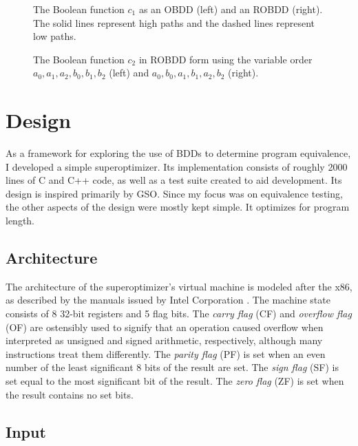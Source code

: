 \documentclass[a4paper,11pt]{kth-mag}
\begin{document}
\begin{figure}
\centering

\caption{The Boolean function $c_1$ as an OBDD (left) and an ROBDD (right). The solid lines represent high paths and the dashed lines represent low paths.}
\label{fig:bdd_c1}
\end{figure}

\begin{figure}
\centering

\caption{The Boolean function $c_2$ in ROBDD form using the variable order $a_0,a_1,a_2,b_0,b_1,b_2$ (left) and $a_0,b_0,a_1,b_1,a_2,b_2$ (right).}
\label{fig:bdd_c2_bad}
\end{figure}

\chapter{Design}
\label{ch:design}

As a framework for exploring the use of BDDs to determine program equivalence, I developed a simple superoptimizer.
Its implementation consists of roughly 2000 lines of C and C++ code, as well as a test suite created to aid development.
Its design is inspired primarily by GSO.
Since my focus was on equivalence testing, the other aspects of the design were mostly kept simple.
It optimizes for program length.

\section{Architecture}

The architecture of the superoptimizer's virtual machine is modeled after the x86, as described by the manuals issued by Intel Corporation \cite{intel_1,intel_2a,intel_2b}. %
The machine state consists of 8 32-bit registers and 5 flag bits.
The \emph{carry flag} (CF) and \emph{overflow flag} (OF) are ostensibly used to signify that an operation caused overflow when interpreted as unsigned and signed arithmetic, respectively, although many instructions treat them differently.
The \emph{parity flag} (PF) is set when an even number of the least significant 8 bits of the result are set.
The \emph{sign flag} (SF) is set equal to the most significant bit of the result.
The \emph{zero flag} (ZF) is set when the result contains no set bits.

\section{Input}
\end{document}
